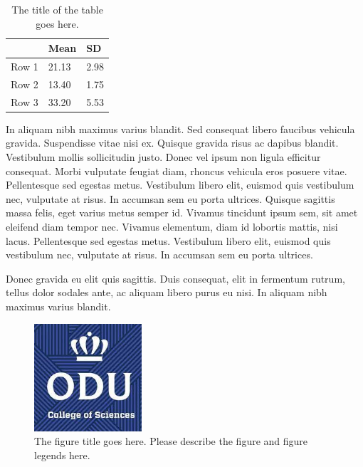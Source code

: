\begin{table}[tbh]
\caption[The title of the table goes here.]{The title of the table goes here.}
\label{tab:table_example1_2}
\begin{center}
\begin{tabular}{lll}
      & Mean  & SD   \\ \hline
Row 1 & 21.13 & 2.98 \\ 
Row 2 & 13.40 & 1.75 \\ 
Row 3 & 33.20 & 5.53 \\ \hline
\end{tabular}
\end{center}
\end{table}

In aliquam nibh maximus varius blandit. Sed consequat libero faucibus vehicula gravida. Suspendisse vitae nisi ex. Quisque gravida risus ac dapibus blandit. Vestibulum mollis sollicitudin justo. Donec vel ipsum non ligula efficitur consequat. Morbi vulputate feugiat diam, rhoncus vehicula eros posuere vitae. Pellentesque sed egestas metus. Vestibulum libero elit, euismod quis vestibulum nec, vulputate at risus. In accumsan sem eu porta ultrices. Quisque sagittis massa felis, eget varius metus semper id. Vivamus tincidunt ipsum sem, sit amet eleifend diam tempor nec. Vivamus elementum, diam id lobortis mattis, nisi lacus. Pellentesque sed egestas metus. Vestibulum libero elit, euismod quis vestibulum nec, vulputate at risus. In accumsan sem eu porta ultrices.

Donec gravida eu elit quis sagittis. Duis consequat, elit in fermentum rutrum, tellus dolor sodales ante, ac aliquam libero purus eu nisi. In aliquam nibh maximus varius blandit.

\begin{figure}[tbh]
  \centering
  \includegraphics[height=4cm]{Figures/cos1.jpeg}
  \caption[The figure title goes here.]{The figure title goes here. Please describe the figure and figure legends here.}
  \label{fig:cos1_8}
\end{figure}

